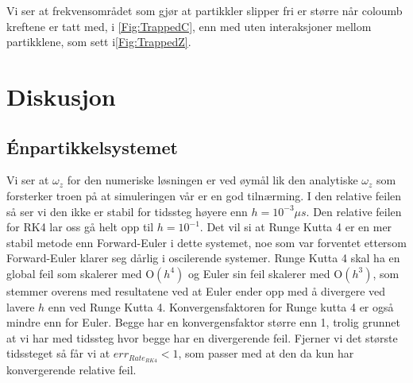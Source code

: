 \documentclass[reprint,english,notitlepage, nofootinbib]{revtex4-1}  %
\begin{document}
Vi ser at frekvensområdet som gjør at partikkler slipper fri er større når coloumb kreftene er tatt med, i \autoref{Fig:TrappedC}, enn med uten interaksjoner mellom partikklene, som sett i\autoref{Fig:TrappedZ}.

\section{Diskusjon}


\subsection*{Énpartikkelsystemet}

 Vi ser at $\omega_z$ for den numeriske løsningen er ved øymål lik den analytiske $\omega_z$ som forsterker troen på at simuleringen vår er en god tilnærming. \newline
I den relative feilen så ser vi den ikke er stabil for tidssteg høyere enn $h = 10^{-3} \mu s$. Den relative feilen for RK4 lar oss gå helt opp til $h = 10^{-1}$. Det vil si at Runge Kutta 4 er en mer stabil metode enn Forward-Euler i dette systemet, noe som var forventet ettersom Forward-Euler klarer seg dårlig i oscilerende systemer. Runge Kutta 4 skal ha en global feil som skalerer med $\mathrm{O}(h^4)$ og Euler sin feil skalerer med $\mathrm{O}(h^3)$, som stemmer overens med resultatene ved at Euler ender opp med å divergere ved lavere $h$ enn ved Runge Kutta 4. Konvergensfaktoren for Runge kutta 4 er også mindre enn for Euler. Begge har en konvergensfaktor større enn 1, trolig grunnet at vi har med tidssteg hvor begge har en divergerende feil. Fjerner vi det største tidssteget så får vi at $err_{Rate_{RK4}} < 1$, som passer med at den da kun har konvergerende relative feil.
\end{document}
